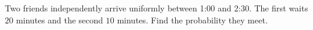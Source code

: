 Two friends independently arrive uniformly between 1:00 and 2:30. The first waits $20$ minutes and the second $10$ minutes. Find the probability they meet.
